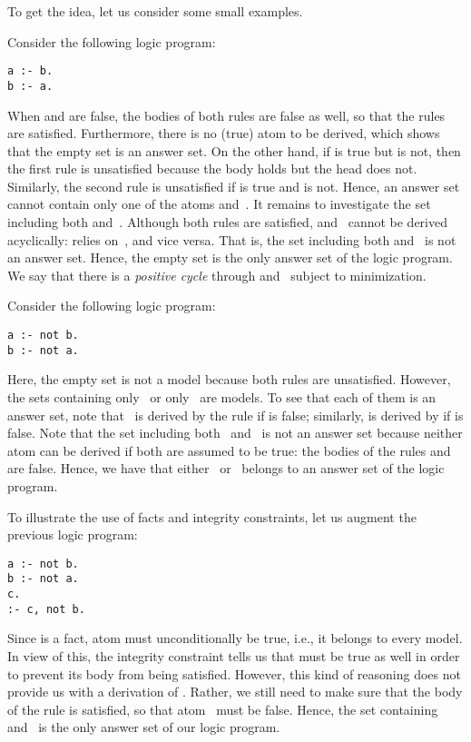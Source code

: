 To get the idea, let us consider some small examples.
%
\begin{example}\label{ex:as:one}
Consider the following logic program:
%
\begin{lstlisting}[numbers=none]
a :- b.
b :- a.
\end{lstlisting}
%
When  and  are false, the bodies of both rules are false as well,
so that the rules are satisfied.
Furthermore, there is no (true) atom to be derived,
which shows that the empty set is an answer set.
On the other hand, 
if  is true but  is not,
then the first rule is unsatisfied because the body holds but the head does not.
Similarly, the second rule is unsatisfied if  is true and  is not.
Hence, an answer set cannot contain only one of the atoms  and~.
It remains to investigate the set including both  and~.
Although both rules are satisfied,
 and~ cannot be derived acyclically:
 relies on~, and vice versa.
That is, the set including both  and~ is not an answer set.
Hence, the empty set is the only answer set of the logic program.
We say that there is a \emph{positive cycle} through  and~
subject to minimization.
\end{example}

Consider the following logic program:
%
\begin{lstlisting}[numbers=none]
a :- not b.
b :- not a.
\end{lstlisting}
%
Here, the empty set is not a model because both rules are unsatisfied.
However, the sets containing only~ or only~ are models.
To see that each of them is an answer set,
note that~ is derived by the rule 
if  is false;
similarly,
 is derived by 
if  is false.
Note that the set including both~ and~ is not an answer set
because neither atom can be derived if both are assumed to be true:
the bodies of the rules
 and
 are false.
Hence, we have that
either~ or~ belongs to
an answer set of the logic program.

To illustrate the use of facts and integrity constraints,
let us augment the previous logic program:
\begin{lstlisting}[numbers=none]
a :- not b.
b :- not a.
c.
:- c, not b.
\end{lstlisting}
Since  is a fact,
atom  must unconditionally be true, i.e.,
it belongs to every model.
In view of this,
the integrity constraint
tells us that  must be true as well
in order to prevent its body from being satisfied.
However, this kind of reasoning does not provide us with
a derivation of .
Rather, we still need to make sure that the body
of the rule  is satisfied,
so that atom~ must be false.
Hence, the set containing  and~
is the only answer set of our logic program.


